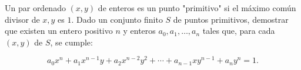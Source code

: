 Un par ordenado $(x, y)$ de enteros es un punto "primitivo" si el máximo común divisor de $x, y$ es $1$. Dado un conjunto finito $S$ de puntos primitivos, demostrar que existen un entero positivo $n$ y enteros $a_0, a_1, \dots , a_n$ tales que, para cada $(x, y)$ de $S$, se cumple:

\[a_0x^n + a_1x^{n-1} y + a_2x^{n-2}y^2 + \cdots + a_{n-1}xy^{n-1} + a_ny^n = 1.\]